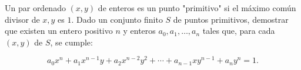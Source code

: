 Un par ordenado $(x, y)$ de enteros es un punto "primitivo" si el máximo común divisor de $x, y$ es $1$. Dado un conjunto finito $S$ de puntos primitivos, demostrar que existen un entero positivo $n$ y enteros $a_0, a_1, \dots , a_n$ tales que, para cada $(x, y)$ de $S$, se cumple:

\[a_0x^n + a_1x^{n-1} y + a_2x^{n-2}y^2 + \cdots + a_{n-1}xy^{n-1} + a_ny^n = 1.\]